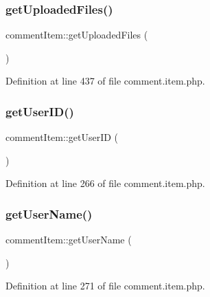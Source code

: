 \subsubsection{\texorpdfstring{get\+Uploaded\+Files()}{getUploadedFiles()}}
{\footnotesize\ttfamily comment\+Item\+::get\+Uploaded\+Files (\begin{DoxyParamCaption}{ }\end{DoxyParamCaption})}



Definition at line 437 of file comment.\+item.\+php.

\mbox{\label{classcommentItem_a5c793e6542e731da5d465c35c77b42fd}} 
\subsubsection{\texorpdfstring{get\+User\+I\+D()}{getUserID()}}
{\footnotesize\ttfamily comment\+Item\+::get\+User\+ID (\begin{DoxyParamCaption}{ }\end{DoxyParamCaption})}



Definition at line 266 of file comment.\+item.\+php.

\mbox{\label{classcommentItem_a1c35032d37e80ad5018a02787f0091fe}} 
\subsubsection{\texorpdfstring{get\+User\+Name()}{getUserName()}}
{\footnotesize\ttfamily comment\+Item\+::get\+User\+Name (\begin{DoxyParamCaption}{ }\end{DoxyParamCaption})}



Definition at line 271 of file comment.\+item.\+php.

\mbox{\label{classcommentItem_abe1774ffe4e8c0f5c14822c5698433da}} 
